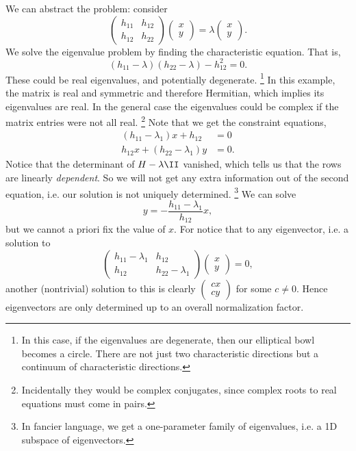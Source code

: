 We can abstract the problem: consider
\begin{equation}
    \begin{pmatrix}
        h_{11} & h_{12}\\
        h_{12} & h_{22}
    \end{pmatrix}
    \begin{pmatrix}
        x \\ y
    \end{pmatrix}
    = \lambda \begin{pmatrix}
        x \\ y
    \end{pmatrix}.
\end{equation}
We solve the eigenvalue problem by finding the characteristic equation. That is,
\begin{equation}
    (h_{11}-\lambda)(h_{22}-\lambda) - h_{12}^2=0.
\end{equation}
These could be real eigenvalues, and potentially degenerate.%
    \footnote{In this case, if the eigenvalues are degenerate, then our elliptical bowl becomes a circle. There are not just two characteristic directions but a continuum of characteristic directions.}
In this example, the matrix is real and symmetric and therefore Hermitian, which implies its eigenvalues are real. In the general case the eigenvalues could be complex if the matrix entries were not all real.%
    \footnote{Incidentally they would be complex conjugates, since complex roots to real equations must come in pairs.}
Note that we get the constraint equations,
\begin{align}
    (h_{11}-\lambda_1)x + h_{12} &= 0\\
    h_{12}x + (h_{22}-\lambda_1)y&=0.
\end{align}
Notice that the determinant of $H-\lambda \II$ vanished, which tells us that the rows are linearly \emph{dependent}. So we will not get any extra information out of the second equation, i.e. our solution is not uniquely determined.%
    \footnote{In fancier language, we get a one-parameter family of eigenvalues, i.e. a 1D subspace of eigenvectors.}
We can solve
\begin{equation}
    y= -\frac{h_{11}-\lambda_1}{h_{12}}x,
\end{equation}
but we cannot a priori fix the value of $x$.
For notice that to any eigenvector, i.e. a solution to
\begin{equation}
    \begin{pmatrix}
        h_{11}-\lambda_1 & h_{12}\\
        h_{12} & h_{22}-\lambda_1
    \end{pmatrix}
    \begin{pmatrix}x\\y
    \end{pmatrix}=0,
\end{equation}
another (nontrivial) solution to this is clearly $\begin{pmatrix}cx\\cy\end{pmatrix}$ for some $c\neq 0$. Hence eigenvectors are only determined up to an overall normalization factor.

